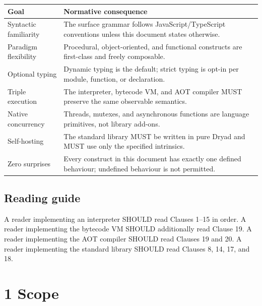 \documentclass[
  english,
  11pt,
  a4paper,
]{article}
\begin{document}
\begin{longtable}[]{@{}
  >{\raggedright\arraybackslash}p{}
  >{\raggedright\arraybackslash}p{}@{}}
\toprule\noalign{}
\begin{minipage}[b]{\linewidth}\raggedright
Goal
\end{minipage} & \begin{minipage}[b]{\linewidth}\raggedright
Normative consequence
\end{minipage} \\
\midrule\noalign{}
\endhead
\bottomrule\noalign{}
\endlastfoot
Syntactic familiarity & The surface grammar follows
JavaScript/TypeScript conventions unless this document states
otherwise. \\
Paradigm flexibility & Procedural, object-oriented, and functional
constructs are first-class and freely composable. \\
Optional typing & Dynamic typing is the default; strict typing is opt-in
per module, function, or declaration. \\
Triple execution & The interpreter, bytecode VM, and AOT compiler MUST
preserve the same observable semantics. \\
Native concurrency & Threads, mutexes, and asynchronous functions are
language primitives, not library add-ons. \\
Self-hosting & The standard library MUST be written in pure Dryad and
MUST use only the specified intrinsics. \\
Zero surprises & Every construct in this document has exactly one
defined behaviour; undefined behaviour is not permitted. \\
\end{longtable}

\subsection{Reading guide}\label{reading-guide}

A reader implementing an interpreter SHOULD read Clauses 1--15 in order.
A reader implementing the bytecode VM SHOULD additionally read Clause
19. A reader implementing the AOT compiler SHOULD read Clauses 19 and
20. A reader implementing the standard library SHOULD read Clauses 8,
14, 17, and 18.

\section{1 Scope}\label{scope}
\end{document}
